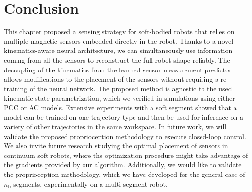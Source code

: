 \section{Conclusion}\label{sec:promasens:conclusion}

This chapter proposed a sensing strategy for soft-bodied robots that relies on multiple magnetic sensors embedded directly in the robot. Thanks to a novel kinematics-aware neural architecture, we can simultaneously use information coming from all the sensors to reconstruct the full robot shape reliably. 
The decoupling of the kinematics from the learned sensor measurement predictor allows modifications to the placement of the sensors without requiring a re-training of the neural network.
The proposed method is agnostic to the used kinematic state parametrization, which we verified in simulations using either \gls{PCC} or \gls{AC} models.
Extensive experiments with a soft segment showed that a model can be trained on one trajectory type and then be used for inference on a variety of other trajectories in the same workspace.
In future work, we will validate the proposed proprioception methodology to execute closed-loop control. %
We also invite future research studying the optimal placement of sensors in continuum soft robots, where the optimization procedure might take advantage of the gradients provided by our algorithm.
Additionally, we would like to validate the proprioception methodology, which we have developed for the general case of $n_\mathrm{b}$ segments, experimentally on a multi-segment robot. 

